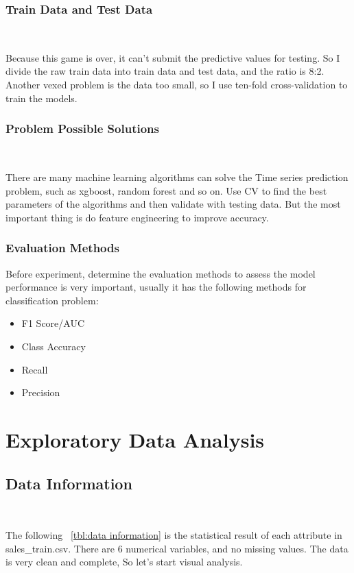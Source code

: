 \subsubsection{Train Data and Test Data}
\

Because this game is over, 
it can't submit the predictive values for testing. 
So I divide the raw train data into train data and test data, 
and the ratio is 8:2. 
Another vexed problem is the data too small, 
so I use ten-fold cross-validation 
to train the models.


\subsubsection{Problem Possible Solutions}
\

There are many machine learning algorithms 
can solve the Time series prediction problem,
such as xgboost,
random forest and so on.
Use CV to find the best parameters of the algorithms 
and then validate with testing data.
But the most important thing is 
do  feature engineering to improve accuracy. 


\subsubsection{Evaluation Methods}


Before experiment, determine the evaluation methods
to assess the model performance is very important,
usually it has the following methods
for classification problem:

\begin{itemize}
	\item F1 Score/AUC
	\item Class Accuracy
	\item Recall
	\item Precision
\end{itemize} 


\section{Exploratory Data Analysis} \label{sec-data_exploration}

\subsection{Data Information}
\

The following  ~\cref{tbl:data information}
is the statistical result of each attribute in sales\_train.csv.
There are 6 numerical variables,
and no missing values.
The data is very clean and complete, So let's start visual analysis.


